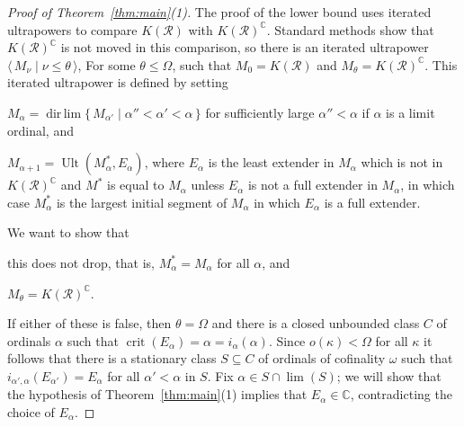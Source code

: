\documentclass[
twoside,
]{article}
\newenvironment{myinparaenum}{\begin{inparaenum}[\upshape(i)]
}{\end{inparaenum}}
\theoremstyle{definition}
\theoremstyle{remark}
\newcommand{\ords}{\Omega}
\newcommand\reals{\mathcal{R}}
\newcommand{\RK}{K(\reals)}
\newcommand{\set}[1]{\{\,#1\,\}}
\newcommand{\pair}[1]{\langle#1\rangle}
\newcommand{\seq}[1]{\pair{\,#1\,}}
\DeclareMathOperator{\crit}{crit}
\DeclareMathOperator{\ult}{Ult}
\DeclareMathOperator{\dirlim}{dir\,lim}
\newcommand\chang{\mathbb{C}}
\begin{document}
\begin{proof}[Proof of Theorem~\ref{thm:main}(1)]
  The proof of the lower bound   uses iterated ultrapowers to
  compare $\RK$ with $\RK^{\chang}$.  Standard methods show that
  $\RK^{\chang}$ is not moved in this comparison, so  there is an
  iterated ultrapower $\seq{M_\nu\mid \nu\le\theta}$, For some
  $\theta\leq\ords$, such that  $M_0=\RK$ and $M_\theta=\RK^\chang$.  
  This iterated ultrapower is defined by setting
  \begin{myinparaenum}\item
    $M_\alpha=\dirlim\set{M_{\alpha'}\mid \alpha''<\alpha'<\alpha}$ for
    sufficiently large $\alpha''<\alpha$ if $\alpha$ is a  limit
    ordinal, and 
  \item
    $ M_{\alpha+1}=\ult(M^*_{\alpha},E_\alpha)$, where 
    $E_{\alpha}$ is the least extender in $M_{\alpha}$ which is not in
    $\RK^{\chang}$ and $M^*$ is equal to $M_{\alpha}$ unless
    $E_{\alpha}$ is not a full extender in $M_{\alpha}$, in which case
    $M^*_{\alpha}$ is the largest initial segment of $M_\alpha$ in which
    $E_{\alpha}$ is a full extender.
  \end{myinparaenum}

  We want to show that 
  \begin{myinparaenum}
  \item 
    this does not drop, that is,  $M^{*}_{\alpha}=M_{\alpha}$ for all $\alpha$, and 
  \item 
    $M_{\theta}=\RK^{\chang}$. 
  \end{myinparaenum}
  
  If either of these is false, then $\theta=\ords$
  and there is a closed unbounded class $C$ of ordinals $\alpha$ such that
  $\crit(E_\alpha)=\alpha=i_{\alpha}(\alpha)$. Since $o(\kappa)<\ords$ for all $\kappa$
  it follows that there is a stationary class $S\subseteq C$ of ordinals of
  cofinality $\omega$ such that $i_{\alpha',\alpha}(E_{\alpha'})=E_{\alpha}$ for all
  $\alpha'<\alpha$ in $S$.  Fix $\alpha\in S\cap\lim(S)$; we will
  show that  the hypothesis of
  Theorem~\ref{thm:main}(1) implies that $E_\alpha\in\chang$, contradicting the choice of $E_\alpha$.




\end{proof}
\end{document}

